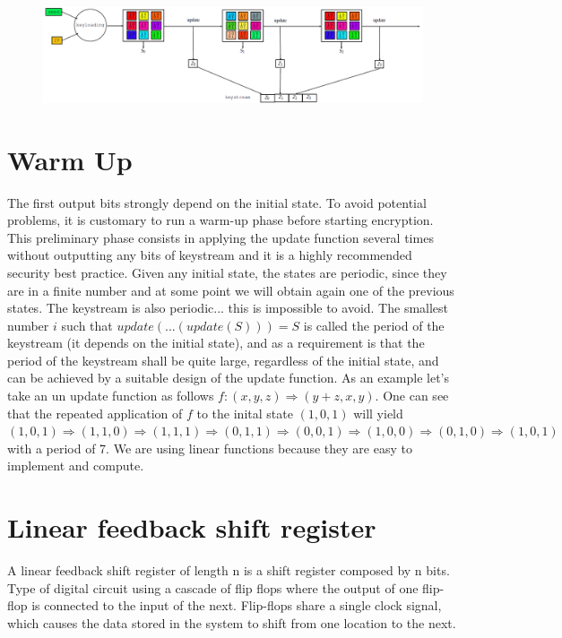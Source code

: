 \begin{figure}
	\centering
	\includegraphics[width=0.9\linewidth]{Images/Chapter2/screenshot004}
	\caption{}
	\label{fig:chapter2_screenshot004}
\end{figure}

\section{Warm Up}

The first output bits strongly depend on the initial state. To avoid potential problems, it is customary to run a warm-up phase before starting encryption. This preliminary phase consists in applying the update function several times without outputting any bits of keystream and it is a highly recommended security best practice.
Given any initial state, the states are periodic, since they are in a finite number and at some point we will obtain again one of the previous states. The keystream is also periodic... this is impossible to avoid. The smallest number $i$ such that $update(...(update(S)))=S$ is called the period of the keystream (it depends on the initial state), and as a requirement is that the period of the keystream shall be quite large, regardless of the initial state, and can be achieved by a suitable design of the update function.
As an example let's take an un update function as follows $f: (x,y,z) \Rightarrow (y+z,x,y)$. One can see that the repeated application of $f$ to the inital state $(1,0,1)$ will yield $(1,0,1) \Rightarrow (1,1,0) \Rightarrow (1,1,1) \Rightarrow (0,1,1) \Rightarrow (0,0,1) \Rightarrow (1,0,0) \Rightarrow (0,1,0) \Rightarrow (1,0,1)$ with a period of 7.
We are using linear functions because they are easy to implement and compute.

\section{Linear feedback shift register}

A linear feedback shift register of length n is a shift register composed by n bits.
Type of digital circuit using a cascade of flip flops where the output of one flip-flop is connected to the input of the next.
Flip-flops share a single clock signal, which causes the data stored in the system to shift from one location to the next.

